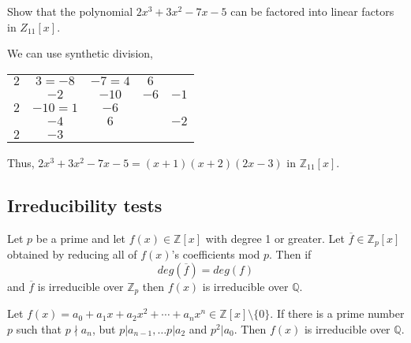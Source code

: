 \begin{example}
    Show that the polynomial $2x^3 + 3x^2 -7x - 5$ can be factored into linear factors in $Z_{11}[x]$.
\end{example}
\begin{solution}
    We can use synthetic division,

    \begin{center}
        \begin{tabular}{cccc|c}
            $2$ & $3 = -8$ & $-7=4$ & $6$ & \\
            & $-2$ & $-10$ & $-6$ & $-1$\\
            \cmidrule{1-4}
            $2$ & $-10 = 1$ & $-6$ & & \\
            & $-4$ & $6$ & & $-2$\\
            \cmidrule{1-4}
            $2$ & $-3$ &  & & \\
        \end{tabular}
    \end{center}

    Thus, $2x^3 + 3x^2 -7x - 5 = (x+1)(x+2)(2x-3)$ in $\mathbb{Z}_{11}[x]$.
\end{solution}

\subsection{Irreducibility tests}

\begin{theorem}
    Let $p$ be a prime and let $f(x) \in \mathbb{Z}[x]$ with degree 1 or greater. Let 
    $\overline{f} \in \mathbb{Z}_p[x]$ obtained by reducing all of $f(x)$'s coefficients 
    mod $p$. Then if 
    \begin{equation}
        deg(\overline{f}) = deg(f)
    \end{equation}
    and $\overline{f}$ is irreducible over $\mathbb{Z}_p$ then $f(x)$ is irreducible over 
    $\mathbb{Q}$.
\end{theorem}

\begin{theorem}
    Let $f(x) = a_0 + a_1x + a_2x^2 + \cdots + a_nx^n \in \mathbb{Z}[x] \setminus \{ 0 \}$. 
    If there is a prime number $p$ such that 
    $p \nmid a_n$, but $p | a_{n-1}, \ldots p | a_{2}$ and $p^2 | a_0$. Then $f(x)$ is 
    irreducible over $\mathbb{Q}$.
\end{theorem}

